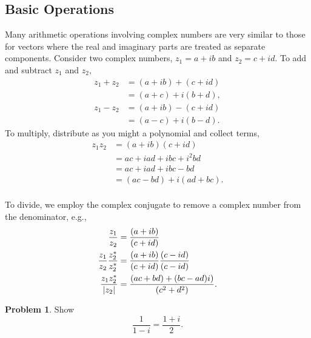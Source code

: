 \documentclass[final,a4paper,12pt]{article}
\theoremstyle{definition}
\newtheorem{problem}{Problem}[section]
\begin{document}
\subsection{Basic Operations}
Many arithmetic operations involving complex numbers are very similar to those
for vectors where the real and imaginary parts are treated as separate
components.  Consider two complex numbers, $z_1 = a + ib$ and $z_2 = c + id$.
To add and subtract $z_1$ and $z_2$,
\begin{align*}
    z_1 + z_2 &= (a + ib) + (c + id) \\
    &= (a + c) + i(b + d) , \\
    z_1 - z_2 &= (a + ib) - (c + id) \\
    &= (a - c) + i(b - d) .
\end{align*}
To multiply, distribute as you might a polynomial and collect terms,
\begin{align*}
    z_1 z_2 &= (a + ib) (c + id) \\
    &= ac + iad + ibc + i^2 bd \\
    &= ac + iad + ibc - bd \\
    &= (ac - bd) + i (ad + bc) . \\
\end{align*}

To divide, we employ the complex conjugate to remove a complex number from the
denominator, e.g.,
\begin{align*}
    \frac{z_1}{z_2} &= \frac{(a + ib)}{(c + id)} \\
    \frac{z_1}{z_2}\frac{z_2^*}{z_2^*} &=
        \frac{(a + ib)}{(c + id)} \frac{(c - id)}{(c - id)} \\
    \frac{z_1 z_2^*}{\abs{z_2}} &= 
        \frac{(ac + bd) + (bc - ad) i)}{(c^2 + d^2)} . \\
\end{align*}

\begin{problem}
Show
\begin{equation*}
    \frac{1}{1 - i} = \frac{1 + i}{2} .
\end{equation*}
\end{problem}
\end{document}
